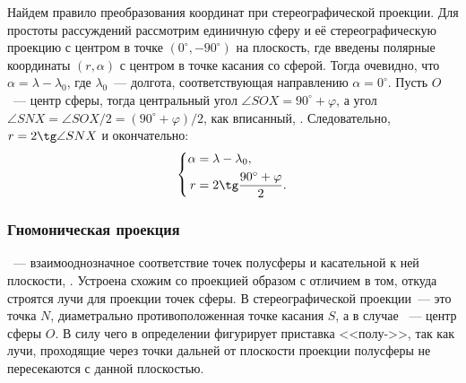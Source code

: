 Найдем правило преобразования координат при стереографической проекции. Для простоты рассуждений рассмотрим единичную сферу и её стереографическую проекцию с центром в точке $(0^\circ, -90^\circ)$ на плоскость, где введены полярные координаты $(r, \alpha)$ с центром в точке касания со сферой. Тогда очевидно, что $\alpha = \lambda - \lambda_0$, где $\lambda_0$~--- долгота, соответствующая направлению $\alpha = 0^\circ$. Пусть $O$~--- центр сферы, тогда центральный угол $\angle SOX = 90^\circ + \varphi$, а угол $\angle SNX = \angle SOX / 2 = (90^\circ + \varphi) / 2$, как вписанный, . Следовательно, $r = 2 \tg \angle SNX$ и окончательно:
\begin{equation}
    \left\{\begin{aligned}
        \alpha &= \lambda - \lambda_0,\\
        r &= 2 \tg \frac{90^\circ + \varphi}{2}.
    \end{aligned}\right.
\end{equation} 

\subsubsection{Гномоническая проекция}
~--- взаимооднозначное соответствие точек полусферы и касательной к ней плоскости, . Устроена схожим со  проекцией образом с отличием в том, откуда строятся лучи для проекции точек сферы. В стереографической проекции~--- это точка $N$, диаметрально противоположенная точке касания $S$, а в случае ~--- центр сферы $O$. В силу чего в определении фигурирует приставка <<полу->>, так как лучи, проходящие через точки дальней от плоскости проекции полусферы не пересекаются с данной плоскостью. 

